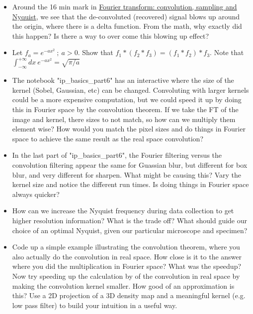 \documentclass[11pt, oneside]{article}   	%
\begin{document}
\begin{itemize}
	\item Around the 16 min mark in \href{https://youtu.be/_F-YDwY9X30}{Fourier transform: convolution, sampling and Nyquist}, we see that the de-convoluted (recovered) signal blows up around the origin, where there is a delta function. From the math, why exactly did this happen? Is there a way to over come this blowing up effect?
	\item Let $f_a=e^{-ax^2} \ ; \ a>0$. Show that $f_1*(f_2*f_3) = (f_1*f_2)*f_3$. Note that $\int_{-\infty}^{+\infty} dx \ e^{-ax^2} = \sqrt{\pi/a}$
	\item The notebook "ip\_basics\_part6" has an interactive where the size of the kernel (Sobel, Gaussian, etc) can be changed. Convoluting with larger kernels could be a more expensive computation, but we could speed it up by doing this in Fourier space by the convolution theorem. If we take the FT of the image and kernel, there sizes to not match, so how can we multiply them element wise? How would you match the pixel sizes and do things in Fourier space to achieve the same result as the real space convolution?
	\item In the last part of "ip\_basics\_part6", the Fourier filtering versus the convolution filtering appear the same for Guassian blur, but different for box blur, and very different for sharpen. What might be causing this? Vary the kernel size and notice the different run times. Is doing things in Fourier space always quicker? 
	\item How can we increase the Nyquist frequency during data collection to get higher resolution information? What is the trade off? What should guide our choice of an optimal Nyquist, given our particular microscope and specimen?
	\item Code up a simple example illustrating the convolution theorem, where you also actually do the convolution in real space. How close is it to the answer where you did the multiplication in Fourier space? What was the speedup? Now try speeding up the calculation by of the convolution in real space by making the convolution kernel smaller. How good of an approximation is this? Use a 2D projection of a 3D density map and a meaningful kernel (e.g. low pass filter) to build your intuition in a useful way.
\end{itemize}

\pagebreak
\end{document}
